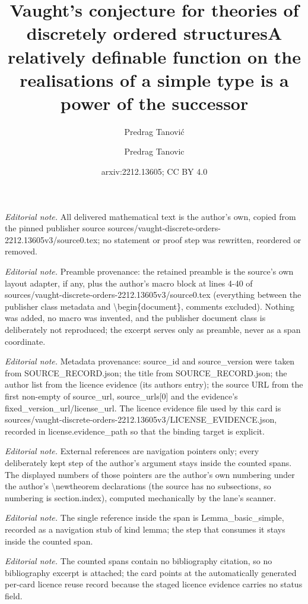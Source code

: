 \documentclass[10pt,a4paper]{amsart}
\title{Vaught's conjecture for theories of discretely ordered structures}
\author{Predrag Tanovi\'c}
\title{A relatively definable function on the realisations of a simple type is a power of the successor}
\author{Predrag Tanovic}
\date{arxiv:2212.13605; CC BY 4.0}
\theoremstyle{definition}
\begin{document}
\maketitle
\noindent\textit{Editorial note.} All delivered mathematical text is the author's own, copied from the pinned publisher source sources/vaught-discrete-orders-2212.13605v3/source0.tex; no statement or proof step was rewritten, reordered or removed.\par\medskip
\noindent\textit{Editorial note.} Preamble provenance: the retained preamble is the source's own layout adapter, if any, plus the author's macro block at lines 4-40 of sources/vaught-discrete-orders-2212.13605v3/source0.tex (everything between the publisher class metadata and \textbackslash{}begin\{document\}, comments excluded). Nothing was added, no macro was invented, and the publisher document class is deliberately not reproduced; the excerpt serves only as preamble, never as a span coordinate.\par\medskip
\noindent\textit{Editorial note.} Metadata provenance: source\_id and source\_version were taken from SOURCE\_RECORD.json; the title from SOURCE\_RECORD.json; the author list from the licence evidence (its authors entry); the source URL from the first non-empty of source\_url, source\_urls[0] and the evidence's fixed\_version\_url/license\_url. The licence evidence file used by this card is sources/vaught-discrete-orders-2212.13605v3/LICENSE\_EVIDENCE.json, recorded in license.evidence\_path so that the binding target is explicit.\par\medskip
\noindent\textit{Editorial note.} External references are navigation pointers only; every deliberately kept step of the author's argument stays inside the counted spans. The displayed numbers of those pointers are the author's own numbering under the author's \textbackslash{}newtheorem declarations (the source has no subsections, so numbering is section.index), computed mechanically by the lane's scanner.\par\medskip
\noindent\textit{Editorial note.} The single reference inside the span is Lemma\_basic\_simple, recorded as a navigation stub of kind lemma; the step that consumes it stays inside the counted span.\par\medskip
\noindent\textit{Editorial note.} The counted spans contain no bibliography citation, so no bibliography excerpt is attached; the card points at the automatically generated per-card licence reuse record because the staged licence evidence carries no status field.\par\medskip
\end{document}

